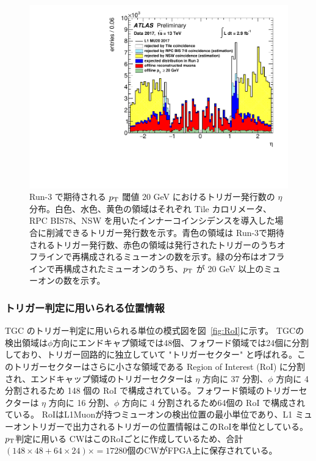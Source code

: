 \begin{figure}[tb]
  \centering
    \includegraphics[clip, width=14cm]{fig/3/ATL-COM-DAQ-2018-033-fig2.pdf}
  \caption{Run-3 で期待される $p_{\rm{T}}$ 閾値 20 GeV におけるトリガー発行数の $\eta$ 分布。白色、水色、黄色の領域はそれぞれ Tile カロリメータ、RPC BIS78、NSW を用いたインナーコインシデンスを導入した場合に削減できるトリガー発行数を示す。青色の領域は Run-3で期待されるトリガー発行数、赤色の領域は発行されたトリガーのうちオフラインで再構成されるミューオンの数を示す。緑の分布はオフラインで再構成されたミューオンのうち、$p_{\rm{T}}$ が 20 GeV 以上のミューオンの数を示す。}
  \label{fig:Rate_innercoincidence}
\end{figure}

\subsubsection{トリガー判定に用いられる位置情報}
TGC のトリガー判定に用いられる単位の模式図を図~\ref{fig:RoI}に示す。
TGCの検出領域は$\phi$方向にエンドキャプ領域では48個、フォワード領域では24個に分割しており、トリガー回路的に独立していて "トリガーセクター" と呼ばれる。このトリガーセクターはさらに小さな領域である Region of Interest (RoI) に分割され、エンドキャップ領域のトリガーセクターは $\eta$ 方向に 37 分割、$\phi$ 方向に 4 分割されるため 148 個の RoI で構成されている。フォワード領域のトリガーセクターは $\eta$ 方向に 16 分割、$\phi$ 方向に 4 分割されるため64個の RoI で構成されている。
RoIはL1Muonが持つミューオンの検出位置の最小単位であり、L1 ミューオントリガーで出力されるトリガーの位置情報はこのRoIを単位としている。
$p_{\rm{T}}$判定に用いる CWはこのRoIごとに作成しているため、合計$(148\times48+64\times24)\times=17280$個のCWがFPGA上に保存されている。

